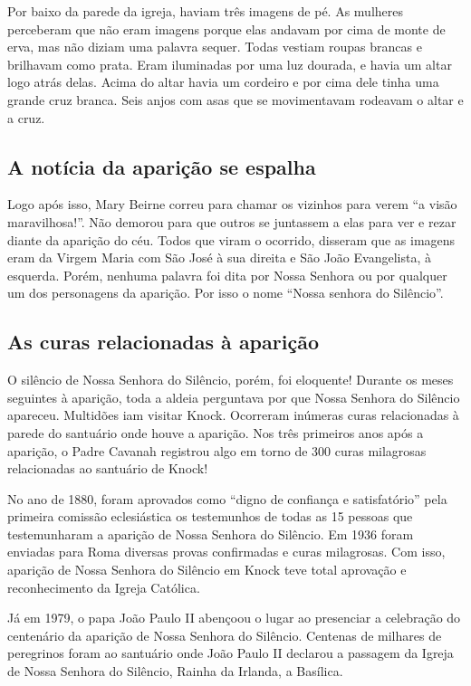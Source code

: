 \documentclass[a4paper,14pt]{extarticle} \usepackage[utf8]{inputenc}
\begin{document}
Por baixo da parede da igreja, haviam três imagens de pé. As mulheres perceberam que não eram imagens porque elas andavam por cima de monte de erva, mas não diziam uma palavra sequer. Todas vestiam roupas brancas e brilhavam como prata. Eram iluminadas por uma luz dourada, e havia um altar logo atrás delas. Acima do altar havia um cordeiro e por cima dele tinha uma grande cruz branca. Seis anjos com asas que se movimentavam rodeavam o altar e a cruz.

\subsection{A notícia da aparição se espalha}

Logo após isso, Mary Beirne correu para chamar os vizinhos para verem “a visão maravilhosa!”. Não demorou para que outros se juntassem a elas para ver e rezar diante da aparição do céu. Todos que viram o ocorrido, disseram que as imagens eram da Virgem Maria com São José à sua direita e São João Evangelista, à esquerda. Porém, nenhuma palavra foi dita por Nossa Senhora ou por qualquer um dos personagens da aparição. Por isso o nome “Nossa senhora do Silêncio”.

\subsection{As curas relacionadas à aparição}

O silêncio de Nossa Senhora do Silêncio, porém, foi eloquente! Durante os meses seguintes à aparição, toda a aldeia perguntava por que Nossa Senhora do Silêncio apareceu. Multidões iam visitar Knock. Ocorreram inúmeras curas relacionadas à parede do santuário onde houve a aparição. Nos três primeiros anos após a aparição, o Padre Cavanah registrou algo em torno de 300 curas milagrosas relacionadas ao santuário de Knock!

No ano de 1880, foram aprovados como “digno de confiança e satisfatório” pela primeira comissão eclesiástica os testemunhos de todas as 15 pessoas que testemunharam a aparição de Nossa Senhora do Silêncio. Em 1936 foram enviadas para Roma diversas provas confirmadas e curas milagrosas. Com isso, aparição de Nossa Senhora do Silêncio em Knock teve total aprovação e reconhecimento da Igreja Católica.

Já em 1979, o papa João Paulo II abençoou o lugar ao presenciar a celebração do centenário da aparição de Nossa Senhora do Silêncio. Centenas de milhares de peregrinos foram ao santuário onde João Paulo II declarou a passagem da Igreja de Nossa Senhora do Silêncio, Rainha da Irlanda, a Basílica.
\end{document}
